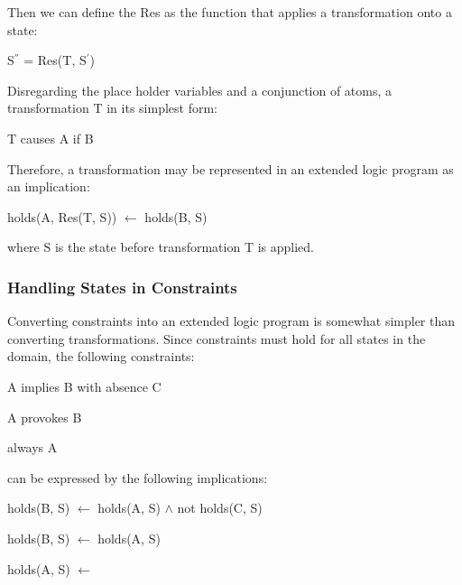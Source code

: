 \documentclass[a4paper]{article}
\begin{document}
        Then we can define the Res as the function that applies a 
        transformation onto a state:
  
        \begin{list}{}{}
          \item S$^{''}$ = Res(T, S$^{'}$)
        \end{list}
  
        Disregarding the place holder variables and a conjunction of atoms, 
        a transformation T in its simplest form:
  
        \begin{list}{}{}
          \item T causes A if B
        \end{list}
  
        Therefore, a transformation may be represented in an extended logic
        program as an implication:
 
        \begin{list}{}{}
          \item holds(A, Res(T, S)) $\leftarrow$ holds(B, S)
        \end{list}

        where S is the state before transformation T is applied.

      \subsubsection{Handling States in Constraints}

        Converting constraints into an extended logic program is somewhat
        simpler than converting transformations. Since constraints must hold
        for all states in the domain, the following constraints:

      \begin{list}{}{}
        \item A implies B with absence C
        \item A provokes B
        \item always A
      \end{list}

        can be expressed by the following implications:

        \begin{list}{}{}
          \item 
            holds(B, S) $\leftarrow$ holds(A, S) $\land$ not holds(C, S)
          \item 
            holds(B, S) $\leftarrow$ holds(A, S)
          \item 
            holds(A, S) $\leftarrow$
        \end{list}
\end{document}

